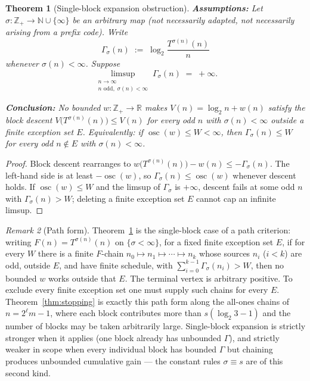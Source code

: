 \documentclass[11pt]{amsart}
\newtheorem{theorem}{Theorem}[section]
\theoremstyle{definition}
\theoremstyle{remark}
\newtheorem{remark}[theorem]{Remark}
\newcommand{\N}{\mathbb{N}}
\newcommand{\Z}{\mathbb{Z}}
\newcommand{\R}{\mathbb{R}}
\begin{document}
\begin{theorem}[Single-block expansion obstruction]\label{thm:expansion}
\textbf{Assumptions:} Let $\sigma : \Z_+ \to \N \cup \{\infty\}$ be an arbitrary map (not necessarily adapted, not necessarily arising from a prefix code). Write
\begin{equation}\label{eq:gamma}
\Gamma_\sigma(n) \;:=\; \log_2 \frac{T^{\sigma(n)}(n)}{n}
\end{equation}
whenever $\sigma(n) < \infty$. Suppose
\[
\limsup_{\substack{n\to\infty \\ n\text{ odd},\;\sigma(n)<\infty}} \Gamma_\sigma(n) \;=\; +\infty .
\]

\textbf{Conclusion:} No bounded $w : \Z_+ \to \R$ makes $V(n) = \log_2 n + w(n)$ satisfy the block descent $V\bigl(T^{\sigma(n)}(n)\bigr) \le V(n)$ for every odd $n$ with $\sigma(n) < \infty$ outside a finite exception set $E$. Equivalently: if $\operatorname{osc}(w) \le W < \infty$, then $\Gamma_\sigma(n) \le W$ for every odd $n \notin E$ with $\sigma(n) < \infty$.
\end{theorem}

\begin{proof}
Block descent rearranges to $w\bigl(T^{\sigma(n)}(n)\bigr) - w(n) \le -\Gamma_\sigma(n)$. The left-hand side is at least $-\operatorname{osc}(w)$, so $\Gamma_\sigma(n) \le \operatorname{osc}(w)$ whenever descent holds. If $\operatorname{osc}(w) \le W$ and the limsup of $\Gamma_\sigma$ is $+\infty$, descent fails at some odd $n$ with $\Gamma_\sigma(n) > W$; deleting a finite exception set $E$ cannot cap an infinite limsup.
\end{proof}

\begin{remark}[Path form]\label{rem:path}
Theorem~\ref{thm:expansion} is the single-block case of a path criterion: writing $F(n) = T^{\sigma(n)}(n)$ on $\{\sigma < \infty\}$, for a fixed finite exception set $E$, if for every $W$ there is a finite $F$-chain $n_0 \mapsto n_1 \mapsto \cdots \mapsto n_k$ whose sources $n_i$ ($i<k$) are odd, outside $E$, and have finite schedule, with $\sum_{i=0}^{k-1} \Gamma_\sigma(n_i) > W$, then no bounded $w$ works outside that $E$. The terminal vertex is arbitrary positive. To exclude every finite exception set one must supply such chains for every $E$. Theorem~\ref{thm:stopping} is exactly this path form along the all-ones chains of $n = 2^\ell m - 1$, where each block contributes more than $s(\log_2 3 - 1)$ and the number of blocks may be taken arbitrarily large. Single-block expansion is strictly stronger when it applies (one block already has unbounded $\Gamma$), and strictly weaker in scope when every individual block has bounded $\Gamma$ but chaining produces unbounded cumulative gain --- the constant rules $\sigma \equiv s$ are of this second kind.
\end{remark}
\end{document}
